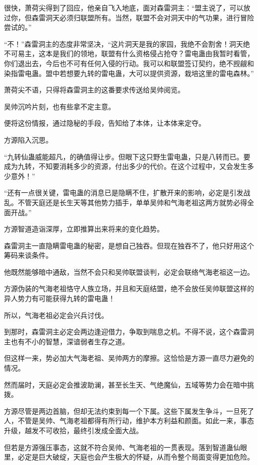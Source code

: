 
\begin{this_body}

很快，萧荷尖得到了回应，他亲自飞入地底，面对森雷洞主：“盟主说了，可以放过你，但森雷洞天必须归联盟所有。当然，联盟不会对洞天中的气功果，进行冒险尝试的。”

“不！”森雷洞主的态度非常坚决，“这片洞天是我的家园，我绝不会割舍！洞天绝不可易主，这本是我们的领地，联盟有什么资格侵占抢夺？雷电蛊由我暂时看管，你们退出去，今后也不可有任何入侵的行动。我可以和联盟签订契约，绝不觊觎和染指雷电蛊。盟中若想要九转的雷电蛊，大可以提供资源，栽培这里的雷电森林。”

萧荷尖不语，只得将森雷洞主的这番要求传送给吴帅阅览。

吴帅沉吟片刻，也有些拿不定主意。

便将这份情报，通过隐秘的手段，告知给了本体，让本体来定夺。

方源陷入沉思。

“九转仙蛊威能超凡，的确值得让步。但眼下这只野生雷电蛊，只是八转而已。要成为九转，不知要消耗多少的资源，付出多少的代价。在这个过程中，又会发生多少意外！”

“还有一点很关键，雷电蛊的消息已是隐瞒不住，扩散开来的影响，必定是引发战乱。不管天庭还是长生天等其他势力插手，单单吴帅和气海老祖这两方就势必得全面开战。”

方源智道造诣深厚，立即推算出来将来的变化趋势。

森雷洞主一直隐瞒雷电蛊的秘密，是想自己独吞。但现在独吞不了，他只好用这个筹码来谈条件。

他既然能够暗中通敌，当然不会只和吴帅联盟谈判，必定会联络气海老祖这一边。

方源伪装的气海老祖恪守人族立场，并且和天庭结盟，绝不会放任吴帅联盟这样的异人势力有可能获得九转的雷电蛊！

所以，气海老祖必定会兴兵讨伐。

到那时，森雷洞主必定会两边逢迎借力，争取到喘息之机。不得不说，这个森雷洞主也有不小的智慧，深谙弱者生存之道。

但这样一来，势必加大气海老祖、吴帅两方的摩擦。这恰恰是方源一直尽力避免的情况。

然而届时，天庭必定会推波助澜，甚至长生天、气绝魔仙，五域等势力会在暗中挑拨。

方源尽管是两边首脑，但却无法约束到每一个下属。这些下属发生争斗，一旦死了人，不管是吴帅、气海老祖都得有所行动，维护本方利益和颜面。如此一来，事态升级，越发不可收拾，最终引发成全面大战。

但若是方源强压事态，这就不符合吴帅、气海老祖的一贯表现。落到智道蛊仙眼里，必定是巨大破绽，天庭也会产生极大的怀疑，从而令整个局面变得更加危险。


\end{this_body}
